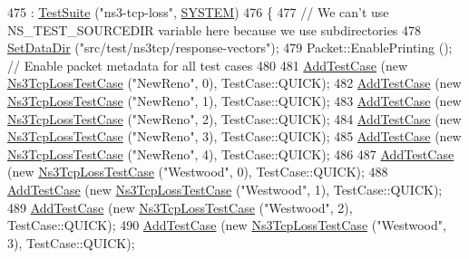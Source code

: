 \begin{DoxyCode}
475   : \hyperlink{classns3_1_1TestSuite_a904b0c40583b744d30908aeb94636d1a}{TestSuite} (\textcolor{stringliteral}{"ns3-tcp-loss"}, \hyperlink{classns3_1_1TestSuite_a1ebfcab34ec8161e085e8e3a1855eae0a90c5529a26ab3a5ffcc6e57040dbd82e}{SYSTEM})
476 \{
477   \textcolor{comment}{// We can't use NS\_TEST\_SOURCEDIR variable here because we use subdirectories}
478   \hyperlink{classns3_1_1TestCase_ab002fb0e5071fcde71a92ca9e8224b23}{SetDataDir} (\textcolor{stringliteral}{"src/test/ns3tcp/response-vectors"});
479   Packet::EnablePrinting ();  \textcolor{comment}{// Enable packet metadata for all test cases}
480 
481   \hyperlink{classns3_1_1TestCase_a3718088e3eefd5d6454569d2e0ddd835}{AddTestCase} (\textcolor{keyword}{new} \hyperlink{classNs3TcpLossTestCase}{Ns3TcpLossTestCase} (\textcolor{stringliteral}{"NewReno"}, 0), TestCase::QUICK);
482   \hyperlink{classns3_1_1TestCase_a3718088e3eefd5d6454569d2e0ddd835}{AddTestCase} (\textcolor{keyword}{new} \hyperlink{classNs3TcpLossTestCase}{Ns3TcpLossTestCase} (\textcolor{stringliteral}{"NewReno"}, 1), TestCase::QUICK);
483   \hyperlink{classns3_1_1TestCase_a3718088e3eefd5d6454569d2e0ddd835}{AddTestCase} (\textcolor{keyword}{new} \hyperlink{classNs3TcpLossTestCase}{Ns3TcpLossTestCase} (\textcolor{stringliteral}{"NewReno"}, 2), TestCase::QUICK);
484   \hyperlink{classns3_1_1TestCase_a3718088e3eefd5d6454569d2e0ddd835}{AddTestCase} (\textcolor{keyword}{new} \hyperlink{classNs3TcpLossTestCase}{Ns3TcpLossTestCase} (\textcolor{stringliteral}{"NewReno"}, 3), TestCase::QUICK);
485   \hyperlink{classns3_1_1TestCase_a3718088e3eefd5d6454569d2e0ddd835}{AddTestCase} (\textcolor{keyword}{new} \hyperlink{classNs3TcpLossTestCase}{Ns3TcpLossTestCase} (\textcolor{stringliteral}{"NewReno"}, 4), TestCase::QUICK);
486 
487   \hyperlink{classns3_1_1TestCase_a3718088e3eefd5d6454569d2e0ddd835}{AddTestCase} (\textcolor{keyword}{new} \hyperlink{classNs3TcpLossTestCase}{Ns3TcpLossTestCase} (\textcolor{stringliteral}{"Westwood"}, 0), TestCase::QUICK);
488   \hyperlink{classns3_1_1TestCase_a3718088e3eefd5d6454569d2e0ddd835}{AddTestCase} (\textcolor{keyword}{new} \hyperlink{classNs3TcpLossTestCase}{Ns3TcpLossTestCase} (\textcolor{stringliteral}{"Westwood"}, 1), TestCase::QUICK);
489   \hyperlink{classns3_1_1TestCase_a3718088e3eefd5d6454569d2e0ddd835}{AddTestCase} (\textcolor{keyword}{new} \hyperlink{classNs3TcpLossTestCase}{Ns3TcpLossTestCase} (\textcolor{stringliteral}{"Westwood"}, 2), TestCase::QUICK);
490   \hyperlink{classns3_1_1TestCase_a3718088e3eefd5d6454569d2e0ddd835}{AddTestCase} (\textcolor{keyword}{new} \hyperlink{classNs3TcpLossTestCase}{Ns3TcpLossTestCase} (\textcolor{stringliteral}{"Westwood"}, 3), TestCase::QUICK);

\end{DoxyCode}

